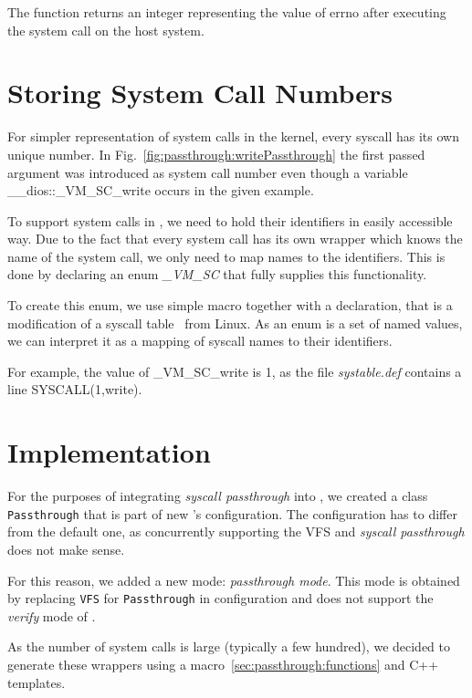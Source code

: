 The function \vmsyscall returns an integer representing the value of errno after executing the system call on the host system.

\section{ Storing System Call Numbers }


For simpler representation of system calls in the kernel, every syscall has its own unique number. In Fig.~\ref{fig:passthrough:writePassthrough} the first passed argument was introduced as system call number even though a variable \_\_dios::\_VM\_SC\_write occurs in the given example.  

To support system calls in \divine, we need to hold their identifiers in easily accessible way. Due to the fact that every system call has its own wrapper which knows the name of the system call, we only need to map names to the identifiers. This is done by declaring an enum \textit{\_VM\_SC} that fully supplies this functionality. 

To create this enum, we use simple macro together with a declaration, that is a modification of a syscall table~\cite{systable} from Linux. As an enum is a set of named values, we can interpret it as a mapping of syscall names to their identifiers. 

For example, the value of  \_VM\_SC\_write is 1, as the file \textit{systable.def} contains a line SYSCALL(1,write).

\section{ Implementation } \label{sec:passthrough:impl}

For the purposes of integrating \textit{syscall passthrough} into \divine, we created a class \texttt{Passthrough} that is part of new \dios's configuration. The configuration has to differ from the default one, as concurrently supporting the VFS and \textit{syscall passthrough} does not make sense. 

For this reason, we added a new mode: \textit{passthrough mode}. This mode is obtained by replacing \texttt{VFS} for \texttt{Passthrough} in configuration and does not support the \textit{verify} mode of \divine.

 As the number of system calls is large (typically a few hundred), we decided to generate these wrappers using a macro~\ref{sec:passthrough:functions} and C++ templates. 
 

